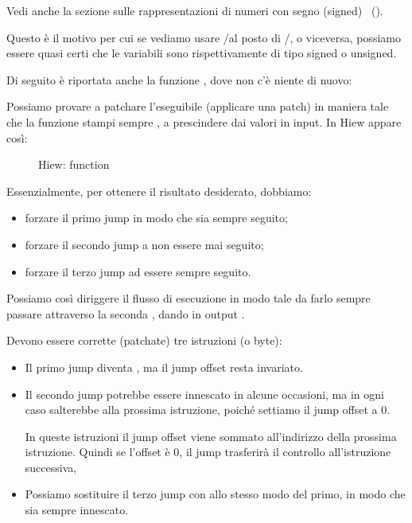 Vedi anche la sezione sulle rappresentazioni di numeri con segno (signed) ~().

Questo è il motivo per cui se vediamo usare \JG/\JL al posto di /\JB, o viceversa, 
possiamo essere quasi certi che le variabili sono rispettivamente di tipo signed o unsigned.

Di seguito è riportata anche la funzione \main, dove non c'è niente di nuovo:





\clearpage
{}

Possiamo provare a patchare l'eseguibile (applicare una patch) in maniera tale che la funzione  stampi sempre , 
a prescindere dai valori in input.
In Hiew appare così:

\begin{figure}[H]
\centering
{}
\caption{Hiew:  function}
\label{fig:jcc_hiew_1}
\end{figure}

Essenzialmente, per ottenere il risultato desiderato, dobbiamo:
\begin{itemize}
\item forzare il primo jump in modo che sia sempre seguito;
\item forzare il secondo jump a non essere mai seguito;
\item forzare il terzo jump ad essere sempre seguito.
\end{itemize}

Possiamo così diriggere il flusso di esecuzione in modo tale da farlo sempre passare attraverso la seconda \printf, dando in output .

Devono essere corrette (patchate) tre istruzioni (o byte):

\begin{itemize}
\item Il primo jump diventa \JMP, ma il \gls{jump offset} resta invariato.

\item 
Il secondo jump potrebbe essere innescato in alcune occasioni, ma in ogni caso salterebbe alla prossima istruzione, poiché settiamo il \gls{jump offset} a 0.

In queste istruzioni il \gls{jump offset} viene sommato all'indirizzo della prossima istruzione.
Quindi se l'offset è 0, il jump trasferirà il controllo all'istruzione successiva,

\item 
Possiamo sostituire il terzo jump con \JMP allo stesso modo del primo, in modo che sia sempre innescato.

\end{itemize}

